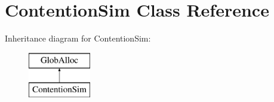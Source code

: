 \hypertarget{classContentionSim}{\section{Contention\-Sim Class Reference}
\label{classContentionSim}
}
Inheritance diagram for Contention\-Sim\-:\begin{figure}[H]
\begin{center}
\leavevmode
\includegraphics[height=2.000000cm]{classContentionSim}
\end{center}
\end{figure}

